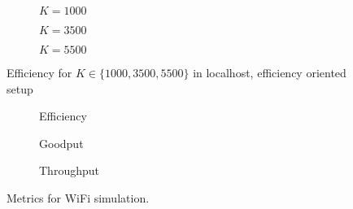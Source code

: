 \begin{figure}[!hp]
\centering
\begin{subfigure}{0.23\textwidth}
	\captionsetup{justification=centering,font=scriptsize}
	\centering
	\setlength\fwidth{\textwidth}
	\setlength{}
	
	\caption{$K=1000$}
	\label{fig:lh_eff_1000_eff}
\end{subfigure}\hspace{2em}%
\begin{subfigure}{0.23\textwidth}
	\captionsetup{justification=centering,font=scriptsize}
	\centering
	\setlength\fwidth{\textwidth}
	\setlength{}
	
	\caption{$K=3500$}
	\label{fig:lh_eff_3500_eff}
\end{subfigure}\hspace{2em}%
\begin{subfigure}{0.23\textwidth}
	\captionsetup{justification=centering,font=scriptsize}
	\centering
	\setlength\fwidth{\textwidth}
	\setlength{}
	
	\caption{$K=5500$}
	\label{fig:lh_eff_5500_eff}
\end{subfigure}
\caption{Efficiency for $K \in \{1000, 3500, 5500\}$ in localhost, efficiency oriented setup}
\label{fig:eff_nonaggr}
\end{figure}

\begin{figure}[!hp]
\centering
\begin{subfigure}{0.23\textwidth}
	\captionsetup{justification=centering,font=scriptsize}
	\centering
	\setlength\fwidth{\textwidth}
	\setlength{}
	
	\caption{Efficiency}
	\label{fig:wifi_eff}
\end{subfigure}\hspace{2em}%
\begin{subfigure}{0.23\textwidth}
	\captionsetup{justification=centering,font=scriptsize}
	\centering
	\setlength\fwidth{\textwidth}
	\setlength{}
	
	\caption{Goodput}
	\label{fig:wifi_good}
\end{subfigure}\hspace{2em}%
\begin{subfigure}{0.23\textwidth}
	\captionsetup{justification=centering,font=scriptsize}
	\centering
	\setlength\fwidth{\textwidth}
	\setlength{}
	
	\caption{Throughput}
	\label{fig:wifi_thr}
\end{subfigure}
\caption{Metrics for WiFi simulation. }
\label{fig:wifi}
\end{figure}

